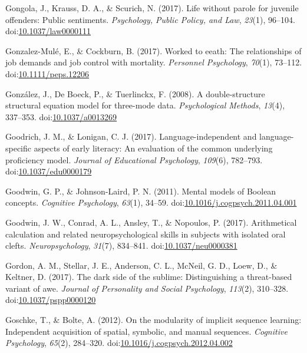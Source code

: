 \documentclass[english,man]{apa6}
\theoremstyle{definition}
\theoremstyle{definition}
\theoremstyle{definition}
\theoremstyle{remark}
\begin{document}
\hypertarget{ref-Gongola2017}{}
Gongola, J., Krauss, D. A., \& Scurich, N. (2017). Life without parole
for juvenile offenders: Public sentiments. \emph{Psychology, Public
Policy, and Law}, \emph{23}(1), 96--104.
doi:\href{https://doi.org/10.1037/law0000111}{10.1037/law0000111}

\hypertarget{ref-Gonzalez-Mule2017}{}
Gonzalez-Mulé, E., \& Cockburn, B. (2017). Worked to eeath: The
relationships of job demands and job control with mortality.
\emph{Personnel Psychology}, \emph{70}(1), 73--112.
doi:\href{https://doi.org/10.1111/peps.12206}{10.1111/peps.12206}

\hypertarget{ref-Gonzalez2008}{}
González, J., De Boeck, P., \& Tuerlinckx, F. (2008). A double-structure
structural equation model for three-mode data. \emph{Psychological
Methods}, \emph{13}(4), 337--353.
doi:\href{https://doi.org/10.1037/a0013269}{10.1037/a0013269}

\hypertarget{ref-Goodrich2017}{}
Goodrich, J. M., \& Lonigan, C. J. (2017). Language-independent and
language-specific aspects of early literacy: An evaluation of the common
underlying proficiency model. \emph{Journal of Educational Psychology},
\emph{109}(6), 782--793.
doi:\href{https://doi.org/10.1037/edu0000179}{10.1037/edu0000179}

\hypertarget{ref-Goodwin2011}{}
Goodwin, G. P., \& Johnson-Laird, P. N. (2011). Mental models of Boolean
concepts. \emph{Cognitive Psychology}, \emph{63}(1), 34--59.
doi:\href{https://doi.org/10.1016/j.cogpsych.2011.04.001}{10.1016/j.cogpsych.2011.04.001}

\hypertarget{ref-Goodwin2017}{}
Goodwin, J. W., Conrad, A. L., Ansley, T., \& Nopoulos, P. (2017).
Arithmetical calculation and related neuropsychological skills in
subjects with isolated oral clefts. \emph{Neuropsychology},
\emph{31}(7), 834--841.
doi:\href{https://doi.org/10.1037/neu0000381}{10.1037/neu0000381}

\hypertarget{ref-Gordon2017}{}
Gordon, A. M., Stellar, J. E., Anderson, C. L., McNeil, G. D., Loew, D.,
\& Keltner, D. (2017). The dark side of the sublime: Distinguishing a
threat-based variant of awe. \emph{Journal of Personality and Social
Psychology}, \emph{113}(2), 310--328.
doi:\href{https://doi.org/10.1037/pspp0000120}{10.1037/pspp0000120}

\hypertarget{ref-Goschke2012}{}
Goschke, T., \& Bolte, A. (2012). On the modularity of implicit sequence
learning: Independent acquisition of spatial, symbolic, and manual
sequences. \emph{Cognitive Psychology}, \emph{65}(2), 284--320.
doi:\href{https://doi.org/10.1016/j.cogpsych.2012.04.002}{10.1016/j.cogpsych.2012.04.002}
\end{document}
